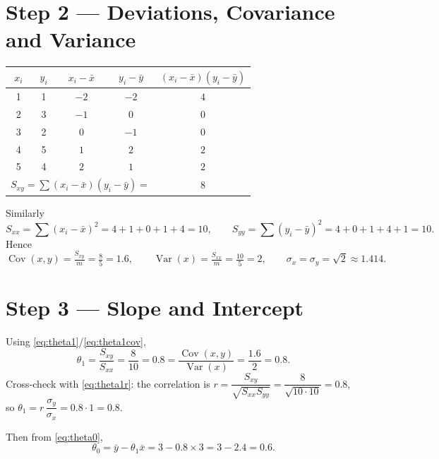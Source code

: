 \documentclass[11pt,a4paper]{report}
\theoremstyle{definition}
\theoremstyle{plain}
\theoremstyle{remark}
\newcommand{\xbar}{\bar{x}}
\newcommand{\ybar}{\bar{y}}
\DeclareMathOperator{\Cov}{Cov}
\DeclareMathOperator{\Var}{Var}
\begin{document}
	\section{Step 2 --- Deviations, Covariance and Variance}
	\begin{center}
		\begin{tabular}{@{}ccccc@{}}
			\toprule
			$x_i$ & $y_i$ & $x_i-\xbar$ & $y_i-\ybar$ & $(x_i-\xbar)(y_i-\ybar)$ \\
			\midrule
			1 & 1 & $-2$ & $-2$ & $4$ \\
			2 & 3 & $-1$ & $ 0$ & $0$ \\
			3 & 2 & $ 0$ & $-1$ & $0$ \\
			4 & 5 & $ 1$ & $ 2$ & $2$ \\
			5 & 4 & $ 2$ & $ 1$ & $2$ \\
			\midrule
			\multicolumn{4}{r}{$S_{xy}=\sum(x_i-\xbar)(y_i-\ybar)=$} & $8$ \\
			\bottomrule
		\end{tabular}
	\end{center}
	Similarly
	\[
	S_{xx}=\sum(x_i-\xbar)^2=4+1+0+1+4=10,\qquad
	S_{yy}=\sum(y_i-\ybar)^2=4+0+1+4+1=10 .
	\]
	Hence
	\[
	\Cov(x,y)=\tfrac{S_{xy}}{m}=\tfrac{8}{5}=1.6,\qquad
	\Var(x)=\tfrac{S_{xx}}{m}=\tfrac{10}{5}=2,\qquad
	\sigma_x=\sigma_y=\sqrt{2}\approx1.414 .
	\]
	
	\section{Step 3 --- Slope and Intercept}
	Using \eqref{eq:theta1}/\eqref{eq:theta1cov},
	\[
	\theta_1=\frac{S_{xy}}{S_{xx}}=\frac{8}{10}=0.8
	=\frac{\Cov(x,y)}{\Var(x)}=\frac{1.6}{2}=0.8 .
	\]
	Cross-check with \eqref{eq:theta1r}: the correlation is
	$r=\dfrac{S_{xy}}{\sqrt{S_{xx}S_{yy}}}=\dfrac{8}{\sqrt{10\cdot10}}=0.8$, so
	$\theta_1=r\,\dfrac{\sigma_y}{\sigma_x}=0.8\cdot1=0.8$. \checkmark
	
	Then from \eqref{eq:theta0},
	\[
	\theta_0=\ybar-\theta_1\xbar=3-0.8\times3=3-2.4=0.6 .
	\]
	
\end{document}
